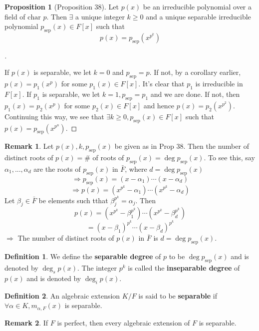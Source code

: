 \documentclass[12pt]{article}
\theoremstyle{definition}
\newtheorem{dfn}{Definition}
\newtheorem{rem}{Remark}
\newtheorem{prop}{Proposition}
\newenvironment{proofs}[1][\proofname]{%
  \begin{proof}[#1]$ $\par\nobreak\ignorespaces
}{%
  \end{proof}
}
\begin{document}
\begin{prop}[Proposition 38]
	Let $p(x)$ be an irreducible polynomial over a field of $\text{char } p$.
	Then $\exists$ a unique integer $k \geq 0$ and a unique separable irreducible polynomial $p_{\text{sep}}(x) \in F[x]$ such that
	\[
		p(x) = p_{\text{sep}}(x^{p^k})
	\]
\end{prop}

\begin{proofs}
	If $p(x)$ is separable, we let $k = 0$ and $p_{\text{sep}} = p$.
	If not, by a corollary earlier,  $p(x) = p_1(x^p)$ for some $p_1(x) \in F[x]$.
	It's clear that $p_1$ is irreducible in $F[x]$.
	If $p_1$ is separable, we let $k = 1, p_{\text{sep}} = p_1$ and we are done.
	If not, then $p_1(x) = p_2(x^p)$ for some $p_2(x) \in F[x]$ and hence $p(x) = p_2(x^{p^2})$.
	Continuing this way, we see that $\exists k \geq 0, p_{\text{sep}}(x) \in F[x]$ such that $p(x) = p_{\text{sep}}(x^{p^n})$.
\end{proofs}

\begin{rem}
	Let $p(x), k, p_{\text{sep}}(x)$ be given as in Prop 38.
	Then the number of distinct roots of $p(x) = \#$ of roots of $p_{\text{sep}}(x) = \deg p_{\text{sep}}(x)$.
	To see this, say $\alpha_1, ..., \alpha_d$ are the roots of $p_{\text{sep}}(x)$ in $\bar{F}$, where $d = \deg p_{\text{sep}}(x)$
	\[
		\Rightarrow p_{\text{sep}}(x) = (x - \alpha_1) \cdots (x - \alpha_d)
	\]
	\[
		\Rightarrow p(x) = (x^{p^k} - \alpha_1) \cdots (x^{p^k} - \alpha_d)
	\]
	Let $\beta_j \in \bar{F}$ be elements such tthat $\beta_j^{p^k} = \alpha_j$.
	Then
	\[
		p(x) = (x^{p^k} - \beta_1^{p^k}) \cdots (x^{p^k} - \beta_d^{p^k})
	\]
	\[
		= (x - \beta_1)^{p^k} \cdots (x - \beta_d)^{p^k}
	\]
	$\Rightarrow$ The number of distinct roots of $p(x)$ in $\bar{F}$ is $d = \deg p_{\text{sep}}(x)$.
\end{rem}

\begin{dfn}
	We define the \textbf{separable degree} of $p$ to be $\deg p_{\text{sep}}(x)$ and is denoted by $\deg_s p(x)$.
	The integer $p^k$ is called the \textbf{inseparable degree} of $p(x)$ and is denoted by $\deg_i p(x)$.
\end{dfn}

\begin{dfn}
	An algebraic extension $K/F$ is said to be \textbf{separable} if $\forall \alpha \in K, m_{\alpha, F}(x)$ is separable.
\end{dfn}

\begin{rem}
	If $F$ is perfect, then every algebraic extension of $F$ is separable.
\end{rem}
\end{document}
